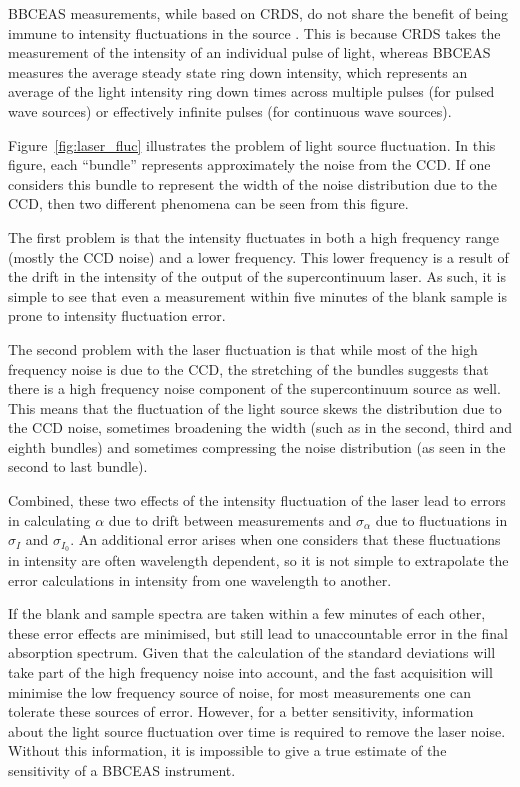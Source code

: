 \ac{BBCEAS} measurements, while based on \ac{CRDS}, do not share the benefit of
being immune to intensity fluctuations in the source \cite{Berden:2009wk}. This
is because \ac{CRDS} takes the measurement of the intensity of an individual
pulse of light, whereas \ac{BBCEAS} measures the average steady state ring down
intensity, which represents an average of the light intensity ring down times
across multiple pulses (for pulsed wave sources) or effectively infinite pulses
(for continuous wave sources).

Figure~\ref{fig:laser_fluc} illustrates the problem of light source
fluctuation. In this figure, each ``bundle'' represents approximately the
noise from the \ac{CCD}. If one considers this bundle to represent the
width of the noise distribution due to the \ac{CCD}, then two different
phenomena can be seen from this figure.

The first problem is that the intensity fluctuates in both a
high frequency range (mostly the \ac{CCD} noise) and a lower frequency. This
lower frequency is a result of the drift in the intensity of the output of the
supercontinuum laser. As such, it is simple to see that even a measurement
within five minutes of the blank sample is prone to intensity fluctuation
error.

The second problem with the laser fluctuation is that while most of the high
frequency noise is due to the \ac{CCD}, the stretching of the bundles suggests
that there is a high frequency noise component of the supercontinuum source as
well. This means that the fluctuation of the light source skews the
distribution due to the \ac{CCD} noise, sometimes broadening the width (such as
in the second, third and eighth bundles) and sometimes compressing the noise
distribution (as seen in the second to last bundle).

Combined, these two effects of the intensity fluctuation of the laser lead to
errors in calculating $\alpha$ due to drift between measurements and
$\sigma_{\alpha}$ due to fluctuations in $\sigma_{I}$ and $\sigma_{I_0}$. An
additional error arises when one considers that these fluctuations in
intensity are often wavelength dependent, so it is not simple to extrapolate
the error calculations in intensity from one wavelength to another.

If the blank and sample spectra are taken within a few minutes of each other,
these error effects are minimised, but still lead to unaccountable error in the
final absorption spectrum. Given that the calculation of the standard
deviations will take part of the high frequency noise into account, and the
fast acquisition will minimise the low frequency source of noise, for most
measurements one can tolerate these sources of error. However, for a
better sensitivity, information about the light source fluctuation over time is
required to remove the laser noise. Without this information, it is impossible
to give a true estimate of the sensitivity of a \ac{BBCEAS} instrument.

